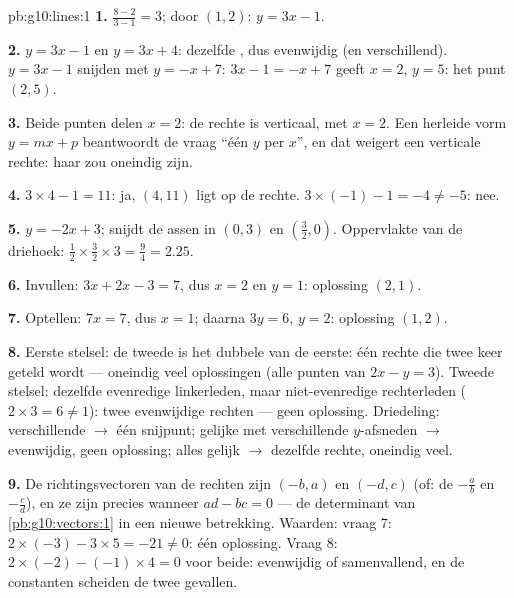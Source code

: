 \begin{solution}{pb:g10:lines:1}
\textbf{1.}  $\frac{8 - 2}{3 - 1} = 3$; door $(1, 2)$:
$y = 3x - 1$.

\textbf{2.} $y = 3x - 1$ en $y = 3x + 4$: dezelfde , dus
evenwijdig (en verschillend). $y = 3x - 1$ snijden met $y = -x + 7$:
$3x - 1 = -x + 7$ geeft $x = 2$, $y = 5$: het punt $(2, 5)$.

\textbf{3.} Beide punten delen $x = 2$: de rechte is verticaal, met
 $x = 2$. Een herleide vorm $y = mx + p$ beantwoordt de vraag
``één $y$ per $x$'', en dat weigert een verticale rechte: haar
 zou oneindig zijn.

\textbf{4.} $3 \times 4 - 1 = 11$: ja, $(4, 11)$ ligt op de rechte.
$3 \times (-1) - 1 = -4 \neq -5$: nee.

\textbf{5.} $y = -2x + 3$; snijdt de assen in $(0, 3)$ en
$\left(\frac32, 0\right)$. Oppervlakte van de driehoek:
$\frac12 \times \frac32 \times 3 = \frac94 = 2.25$.

\textbf{6.} Invullen: $3x + 2x - 3 = 7$, dus $x = 2$ en $y = 1$: oplossing
$(2, 1)$.

\textbf{7.} Optellen: $7x = 7$, dus $x = 1$; daarna $3y = 6$, $y = 2$:
oplossing $(1, 2)$.

\textbf{8.} Eerste stelsel: de tweede  is het dubbele van de
eerste: één rechte die twee keer geteld wordt --- oneindig veel oplossingen
(alle punten van $2x - y = 3$). Tweede stelsel: dezelfde evenredige
linkerleden, maar niet-evenredige rechterleden ($2 \times 3 = 6 \neq 1$):
twee evenwijdige rechten --- geen oplossing. Driedeling: verschillende
 $\to$ één snijpunt; gelijke  met
verschillende $y$-afsneden $\to$ evenwijdig, geen oplossing; alles gelijk
$\to$ dezelfde rechte, oneindig veel.

\textbf{9.} De richtingsvectoren van de rechten zijn $(-b, a)$ en $(-d, c)$
(of: de  $-\frac ab$ en $-\frac cd$), en ze zijn
 precies wanneer $ad - bc = 0$ --- de determinant van
\cref{pb:g10:vectors:1} in een nieuwe betrekking. Waarden: vraag 7:
$2 \times (-3) - 3 \times 5 = -21 \neq 0$: één oplossing. Vraag 8:
$2 \times (-2) - (-1) \times 4 = 0$ voor beide: evenwijdig of samenvallend,
en de constanten scheiden de twee gevallen.


\end{solution}
